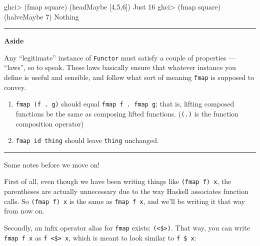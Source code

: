 \documentclass[]{article}
\newenvironment{Shaded}{}{}
\newcommand{\DataTypeTok}[1]{\textcolor[rgb]{0.56,0.13,0.00}{#1}}
\newcommand{\DecValTok}[1]{\textcolor[rgb]{0.25,0.63,0.44}{#1}}
\newcommand{\FunctionTok}[1]{\textcolor[rgb]{0.02,0.16,0.49}{#1}}
\newcommand{\NormalTok}[1]{#1}
\begin{document}
\begin{Shaded}
\begin{Highlighting}[]
\NormalTok{ghci}\FunctionTok{>}\NormalTok{ (fmap square) (headMaybe [}\DecValTok{4}\NormalTok{,}\DecValTok{5}\NormalTok{,}\DecValTok{6}\NormalTok{])}
\DataTypeTok{Just} \DecValTok{16}
\NormalTok{ghci}\FunctionTok{>}\NormalTok{ (fmap square) (halveMaybe }\DecValTok{7}\NormalTok{)}
\DataTypeTok{Nothing}
\end{Highlighting}
\end{Shaded}

\begin{center}\rule{0.5\linewidth}{\linethickness}\end{center}

\textbf{Aside}

Any ``legitimate'' instance of \texttt{Functor} must satisfy a couple of
properties --- ``laws'', so to speak. These laws basically ensure that whatever
instance you define is useful and sensible, and follow what sort of meaning
\texttt{fmap} is supposed to convey.

\begin{enumerate}
\def\labelenumi{\arabic{enumi}.}
\tightlist
\item
  \texttt{fmap\ (f\ .\ g)} should equal \texttt{fmap\ f\ .\ fmap\ g}; that is,
  lifting composed functions be the same as composing lifted functions.
  (\texttt{(.)} is the function composition operator)
\item
  \texttt{fmap\ id\ thing} should leave \texttt{thing} unchanged.
\end{enumerate}

\begin{center}\rule{0.5\linewidth}{\linethickness}\end{center}

Some notes before we move on!

First of all, even though we have been writing things like
\texttt{(fmap\ f)\ x}, the parentheses are actually unnecessary due to the way
Haskell associates function calls. So \texttt{(fmap\ f)\ x} is the same as
\texttt{fmap\ f\ x}, and we'll be writing it that way from now on.

Secondly, an infix operator alias for \texttt{fmap} exists:
\texttt{(\textless{}\$\textgreater{})}. That way, you can write
\texttt{fmap\ f\ x} as \texttt{f\ \textless{}\$\textgreater{}\ x}, which is
meant to look similar to \texttt{f\ \$\ x}:

\begin{Shaded}
\end{Shaded}
\end{document}
